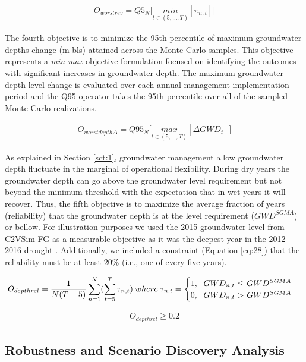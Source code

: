 \documentclass[a4paper,fleqn]{cas-sc}
\begin{document}
\begin{align}
O_{worstrev} = Q5_{N} \bigg[\underset{t\in(5,...,T)}{min}[\pi_{n,t}]\bigg]
\end{align}

The fourth objective is to minimize the 95th percentile of maximum groundwater depths change (m bls) attained across the Monte Carlo samples. This objective represents a \textit{min-max} objective formulation focused on identifying the outcomes with significant increases in groundwater depth. The maximum groundwater depth level change is evaluated over each annual management implementation period and the Q95 operator takes the 95th percentile over all of the sampled Monte Carlo  realizations. 

\begin{align}
O_{worstdepth\Delta} = Q95_{N} \bigg[\underset{t\in(5,...,T)}{max}[\overline{\Delta GWD}_{t}]\bigg]
\end{align}

As explained in Section \ref{sct:1}, groundwater management allow groundwater depth fluctuate in the marginal of operational flexibility. During dry years the groundwater depth can go above the groundwater level requirement but not beyond the minimum threshold with the expectation that in wet years it will recover. Thus, the fifth objective is to maximize the average fraction of years (reliability) that the groundwater depth is at the level requirement ($GWD^{SGMA}$) or bellow. For illustration purposes we used the 2015 groundwater level from C2VSim-FG as a measurable objective as it was the deepest year in the  2012-2016 drought \citep{lund_lessons_2018}. Additionally, we included a constraint (Equation \ref{eq:28}) that the reliability must be at least 20\% (i.e., one of every five years). 

\begin{align}
O_{depthrel} = \frac{1}{N(T-5)}\sum_{n=1}^N(\sum_{t=5}^T \tau_{n,t})\; where\; \tau_{n,t} = \begin{cases}
      1, \text{\; $GWD_{n,t}$  $\leq$ $GWD^{SGMA}$}\\
      0, \text{\; $GWD_{n,t}$ $>$ $GWD^{SGMA}$}\\
\end{cases}      
\end{align}


\begin{align}\label{eq:28}
O_{depthrel} \geq 0.2
\end{align}

\subsection{Robustness and Scenario Discovery Analysis}
\end{document}
